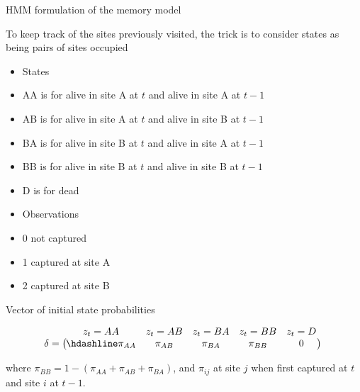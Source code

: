 \documentclass[
  12pt,
]{krantz}
\begin{document}
HMM formulation of the memory model

To keep track of the sites previously visited, the trick is to consider states as being pairs of sites occupied

\begin{itemize}
\item
  States
\item
  AA is for alive in site A at \(t\) and alive in site A at \(t-1\)
\item
  AB is for alive in site A at \(t\) and alive in site B at \(t-1\)
\item
  BA is for alive in site B at \(t\) and alive in site A at \(t-1\)
\item
  BB is for alive in site B at \(t\) and alive in site B at \(t-1\)
\item
  D is for dead
\item
  Observations
\item
  0 not captured
\item
  1 captured at site A
\item
  2 captured at site B
\end{itemize}

Vector of initial state probabilities

\[
\begin{matrix}
& \\
\mathbf{\delta} =
\left ( \vphantom{ \begin{matrix} 12 \end{matrix} } \right .
\end{matrix}
\hspace{-1.2em}
\begin{matrix}
z_t=AA & z_t=AB & z_t=BA & z_t=BB &z_t=D \\ \hdashline
\pi_{AA} & \pi_{AB} & \pi_{BA} & \pi_{BB} & 0\\
\end{matrix}
\hspace{-0.2em}
\begin{matrix}
& \\
\left . \vphantom{ \begin{matrix} 12 \end{matrix} } \right )
\begin{matrix}
\end{matrix}
\end{matrix}
\]

where \(\pi_{BB} = 1 - (\pi_{AA} + \pi_{AB} + \pi_{BA})\), and \(\pi_{ij}\) at site \(j\) when first captured at \(t\) and site \(i\) at \(t - 1\).
\end{document}
